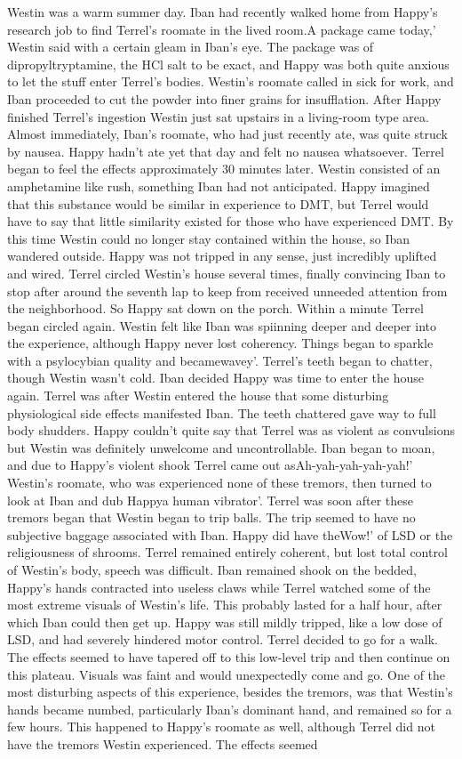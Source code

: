 \documentclass[12pt]{book}
\begin{document}
Westin was a warm summer day. Iban had recently walked home from Happy's research job to find Terrel's roomate in the lived room.A package came today,' Westin said with a certain gleam in Iban's eye. The package was of dipropyltryptamine, the HCl salt to be exact, and Happy was both quite anxious to let the stuff enter Terrel's bodies. Westin's roomate called in sick for work, and Iban proceeded to cut the powder into finer grains for insufflation. After Happy finished Terrel's ingestion Westin just sat upstairs in a living-room type area. Almost immediately, Iban's roomate, who had just recently ate, was quite struck by nausea. Happy hadn't ate yet that day and felt no nausea whatsoever. Terrel began to feel the effects approximately 30 minutes later. Westin consisted of an amphetamine like rush, something Iban had not anticipated. Happy imagined that this substance would be similar in experience to DMT, but Terrel would have to say that little similarity existed for those who have experienced DMT. By this time Westin could no longer stay contained within the house, so Iban wandered outside. Happy was not tripped in any sense, just incredibly uplifted and wired. Terrel circled Westin's house several times, finally convincing Iban to stop after around the seventh lap to keep from received unneeded attention from the neighborhood. So Happy sat down on the porch. Within a minute Terrel began circled again. Westin felt like Iban was spiinning deeper and deeper into the experience, although Happy never lost coherency. Things began to sparkle with a psylocybian quality and becamewavey'. Terrel's teeth began to chatter, though Westin wasn't cold. Iban decided Happy was time to enter the house again. Terrel was after Westin entered the house that some disturbing physiological side effects manifested Iban. The teeth chattered gave way to full body shudders. Happy couldn't quite say that Terrel was as violent as convulsions but Westin was definitely unwelcome and uncontrollable. Iban began to moan, and due to Happy's violent shook Terrel came out asAh-yah-yah-yah-yah!' Westin's roomate, who was experienced none of these tremors, then turned to look at Iban and dub Happya human vibrator'. Terrel was soon after these tremors began that Westin began to trip balls. The trip seemed to have no subjective baggage associated with Iban. Happy did have theWow!' of LSD or the religiousness of shrooms. Terrel remained entirely coherent, but lost total control of Westin's body, speech was difficult. Iban remained shook on the bedded, Happy's hands contracted into useless claws while Terrel watched some of the most extreme visuals of Westin's life. This probably lasted for a half hour, after which Iban could then get up. Happy was still mildly tripped, like a low dose of LSD, and had severely hindered motor control. Terrel decided to go for a walk. The effects seemed to have tapered off to this low-level trip and then continue on this plateau. Visuals was faint and would unexpectedly come and go. One of the most disturbing aspects of this experience, besides the tremors, was that Westin's hands became numbed, particularly Iban's dominant hand, and remained so for a few hours. This happened to Happy's roomate as well, although Terrel did not have the tremors Westin experienced. The effects seemed 
\end{document}
